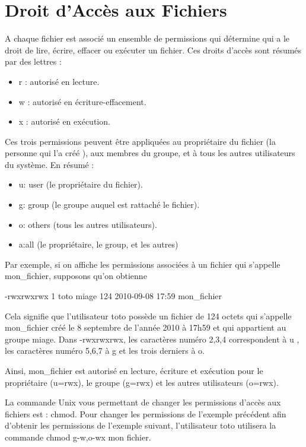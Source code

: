 \documentclass[10pt,a4paper]{article}
\begin{document}
\section{Droit d'Accès aux Fichiers}

A chaque fichier est associé un ensemble de permissions qui détermine qui a le droit de lire, écrire, effacer ou exécuter un fichier. Ces droits d'accès sont résumés par des lettres :
\begin{itemize}
\item r : autorisé en lecture.
\item w : autorisé en écriture-effacement.
\item x : autorisé en exécution.
\end{itemize}


Ces trois permissions peuvent être appliquées au propriétaire du fichier (la personne qui l'a créé ), aux membres du groupe, et à tous les autres utilisateurs du système. En résumé :
\begin{itemize}
\item  u: user (le propriétaire du fichier).
\item  g: group (le groupe auquel est rattaché le fichier).
\item  o: others (tous les autres utilisateurs).
\item a:all (le propriétaire, le group, et les autres)
\end{itemize}

Par exemple, si on affiche les permissions associées à un fichier qui s'appelle mon\_fichier, supposons qu'on obtienne
\begin{center}
 -rwxrwxrwx 1 toto miage 124 2010-09-08 17:59 mon\_fichier
\end{center}

Cela signifie que l'utilisateur toto possède un fichier de 124 octets qui s'appelle mon\_fichier créé le 8 septembre de l'année 2010 à 17h59 et qui appartient au groupe miage. Dans -rwxrwxrwx, les caractères numéro 2,3,4 correspondent à u , les caractères numéro 5,6,7 à g et les trois derniers à o.

Ainsi, mon\_fichier est autorisé en lecture, écriture et exécution pour le propriétaire (u=rwx), le groupe (g=rwx) et les autres utilisateurs (o=rwx).


La commande Unix vous permettant de changer les permissions d'accès aux fichiers est : chmod. Pour changer les permissions de l'exemple précédent afin d'obtenir les permissions de l'exemple suivant,
l'utilisateur toto utilisera la commande chmod g-w,o-wx mon fichier.
\end{document}
